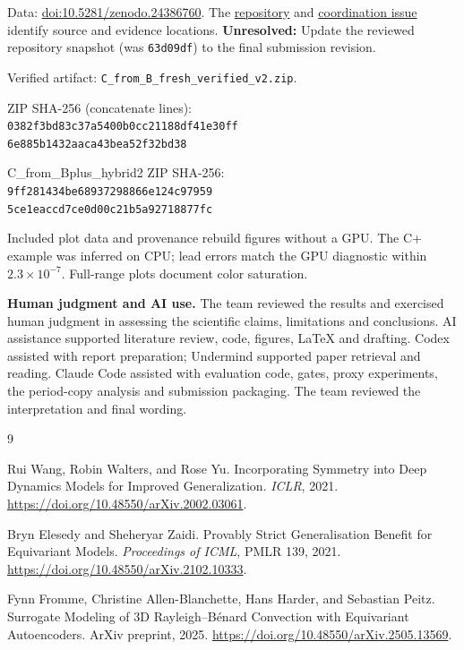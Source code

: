 \documentclass{article}
\newcommand{\pending}[1]{%
  \textcolor{blue!60!black}{\textbf{Unresolved:} #1}
}
\begin{document}
Data:
\href{https://doi.org/10.5281/zenodo.24386760}
{doi:10.5281/zenodo.24386760}.
The
\href{https://github.com/pranavvkrishna/GalileoHackathon-Optimus}
{repository}
and
\href{https://github.com/pranavvkrishna/GalileoHackathon-Optimus/issues/2}
{coordination issue}
identify source and evidence locations.
\pending{Update the reviewed repository snapshot (was \texttt{63d09df}) to the final submission revision.}

\medskip
\noindent Verified artifact:
\texttt{C\_from\_B\_fresh\_verified\_v2.zip}.

\noindent ZIP SHA-256 (concatenate lines):\\
\texttt{0382f3bd83c37a5400b0cc21188df41e30ff}\\
\texttt{6e885b1432aaca43bea52f32bd38}

\noindent C\_from\_Bplus\_hybrid2 ZIP SHA-256:\\
\texttt{9ff281434be68937298866e124c97959}\\
\texttt{5ce1eaccd7ce0d00c21b5a92718877fc}

\medskip
Included plot data and provenance rebuild figures without a GPU.
The C+ example was inferred on CPU; lead errors match the GPU
diagnostic within $2.3\times10^{-7}$.
Full-range plots document color saturation.

\medskip
\noindent\textbf{Human judgment and AI use.}
The team reviewed the results and exercised human judgment in
assessing the scientific claims, limitations and conclusions.
AI assistance supported literature review, code, figures, LaTeX
and drafting. Codex assisted with report preparation;
Undermind supported paper retrieval and reading.
Claude Code assisted with evaluation code, gates, proxy experiments,
the period-copy analysis and submission packaging.
The team reviewed the interpretation and final wording.

\clearpage
\begin{thebibliography}{9}

Rui Wang, Robin Walters, and Rose Yu.
Incorporating Symmetry into Deep Dynamics Models for Improved
Generalization.
\emph{ICLR}, 2021.
\url{https://doi.org/10.48550/arXiv.2002.03061}.

Bryn Elesedy and Sheheryar Zaidi.
Provably Strict Generalisation Benefit for Equivariant Models.
\emph{Proceedings of ICML}, PMLR 139, 2021.
\url{https://doi.org/10.48550/arXiv.2102.10333}.

Fynn Fromme, Christine Allen-Blanchette, Hans Harder,
and Sebastian Peitz.
Surrogate Modeling of 3D Rayleigh--B\'enard Convection with
Equivariant Autoencoders.
ArXiv preprint, 2025.
\url{https://doi.org/10.48550/arXiv.2505.13569}.

\end{thebibliography}
\end{document}
